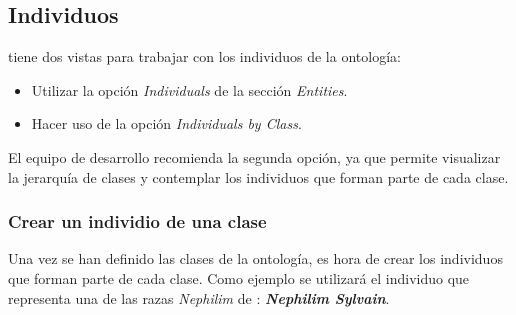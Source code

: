 \subsection{Individuos}
\protege tiene dos vistas para trabajar con los individuos de la ontología:
\begin{itemize}
    \item Utilizar la opción \textit{Individuals} de la sección \textit{Entities}.
    \item Hacer uso de la opción \textit{Individuals by Class}.
\end{itemize}
El equipo de desarrollo recomienda la segunda opción, ya que permite visualizar la jerarquía de clases y 
contemplar los individuos que forman parte de cada clase.

\subsubsection{Crear un individio de una clase}
Una vez se han definido las clases de la ontología, es hora de crear los individuos que forman parte de cada clase.
Como ejemplo se utilizará el individuo que representa una de las razas \textit{Nephilim} de \anima: \textit{\textbf{Nephilim Sylvain}}.

